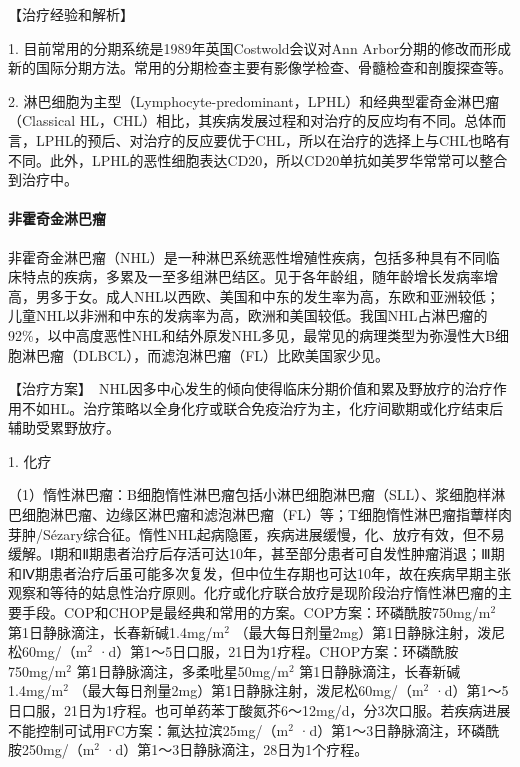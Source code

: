 【治疗经验和解析】

1. 目前常用的分期系统是1989年英国Costwold会议对Ann
Arbor分期的修改而形成新的国际分期方法。常用的分期检查主要有影像学检查、骨髓检查和剖腹探查等。

2.
淋巴细胞为主型（Lymphocyte-predominant，LPHL）和经典型霍奇金淋巴瘤（Classical
HL，CHL）相比，其疾病发展过程和对治疗的反应均有不同。总体而言，LPHL的预后、对治疗的反应要优于CHL，所以在治疗的选择上与CHL也略有不同。此外，LPHL的恶性细胞表达CD20，所以CD20单抗如美罗华常常可以整合到治疗中。

\paragraph{非霍奇金淋巴瘤}

非霍奇金淋巴瘤（NHL）是一种淋巴系统恶性增殖性疾病，包括多种具有不同临床特点的疾病，多累及一至多组淋巴结区。见于各年龄组，随年龄增长发病率增高，男多于女。成人NHL以西欧、美国和中东的发生率为高，东欧和亚洲较低；儿童NHL以非洲和中东的发病率为高，欧洲和美国较低。我国NHL占淋巴瘤的92\%，以中高度恶性NHL和结外原发NHL多见，最常见的病理类型为弥漫性大B细胞淋巴瘤（DLBCL），而滤泡淋巴瘤（FL）比欧美国家少见。

【治疗方案】　NHL因多中心发生的倾向使得临床分期价值和累及野放疗的治疗作用不如HL。治疗策略以全身化疗或联合免疫治疗为主，化疗间歇期或化疗结束后辅助受累野放疗。

1. 化疗

（1）惰性淋巴瘤：B细胞惰性淋巴瘤包括小淋巴细胞淋巴瘤（SLL）、浆细胞样淋巴细胞淋巴瘤、边缘区淋巴瘤和滤泡淋巴瘤（FL）等；T细胞惰性淋巴瘤指蕈样肉芽肿/Sézary综合征。惰性NHL起病隐匿，疾病进展缓慢，化、放疗有效，但不易缓解。Ⅰ期和Ⅱ期患者治疗后存活可达10年，甚至部分患者可自发性肿瘤消退；Ⅲ期和Ⅳ期患者治疗后虽可能多次复发，但中位生存期也可达10年，故在疾病早期主张观察和等待的姑息性治疗原则。化疗或化疗联合放疗是现阶段治疗惰性淋巴瘤的主要手段。COP和CHOP是最经典和常用的方案。COP方案：环磷酰胺750mg/m$^2$
第1日静脉滴注，长春新碱1.4mg/m$^2$
（最大每日剂量2mg）第1日静脉注射，泼尼松60mg/（m$^2$
·d）第1～5日口服，21日为1疗程。CHOP方案：环磷酰胺750mg/m$^2$
第1日静脉滴注，多柔吡星50mg/m$^2$ 第1日静脉滴注，长春新碱1.4mg/m$^2$
（最大每日剂量2mg）第1日静脉注射，泼尼松60mg/（m$^2$
·d）第1～5日口服，21日为1疗程。也可单药苯丁酸氮芥6～12mg/d，分3次口服。若疾病进展不能控制可试用FC方案：氟达拉滨25mg/（m$^2$
·d）第1～3日静脉滴注，环磷酰胺250mg/（m$^2$
·d）第1～3日静脉滴注，28日为1个疗程。

